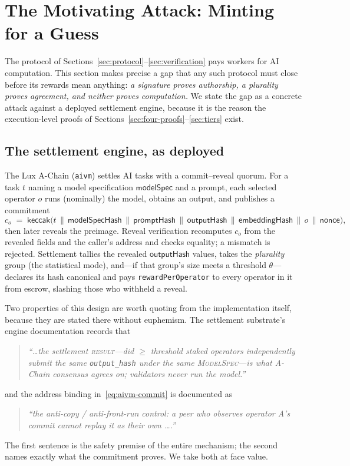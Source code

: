 \section{The Motivating Attack: Minting for a Guess}
\label{sec:guess-to-mint}

The protocol of Sections~\ref{sec:protocol}--\ref{sec:verification} pays workers
for AI computation. This section makes precise a gap that any such protocol must
close before its rewards mean anything: \emph{a signature proves authorship, a
plurality proves agreement, and neither proves computation.} We state the gap as
a concrete attack against a deployed settlement engine, because it is the reason
the execution-level proofs of Sections~\ref{sec:four-proofs}--\ref{sec:tiers}
exist.

\subsection{The settlement engine, as deployed}

The Lux A-Chain (\texttt{aivm}) settles AI tasks with a commit--reveal quorum.
For a task $t$ naming a model specification $\mathsf{modelSpec}$ and a prompt,
each selected operator $o$ runs (nominally) the model, obtains an output, and
publishes a commitment
\begin{equation}
\label{eq:aivm-commit}
c_o \;=\; \mathsf{keccak}\bigl(t \,\|\, \mathsf{modelSpecHash} \,\|\,
   \mathsf{promptHash} \,\|\, \mathsf{outputHash} \,\|\,
   \mathsf{embeddingHash} \,\|\, o \,\|\, \mathsf{nonce}\bigr),
\end{equation}
then later reveals the preimage. Reveal verification recomputes $c_o$ from the
revealed fields and the caller's address and checks equality; a mismatch is
rejected. Settlement tallies the revealed $\mathsf{outputHash}$ values, takes the
\emph{plurality} group (the statistical mode), and---if that group's size meets a
threshold $\theta$---declares its hash canonical and pays \texttt{rewardPerOperator}
to every operator in it from escrow, slashing those who withheld a reveal.

Two properties of this design are worth quoting from the implementation itself,
because they are stated there without euphemism. The settlement substrate's
engine documentation records that
\begin{quote}\itshape
``\ldots the settlement \textsc{result}---did $\ge$ threshold staked operators
independently submit the same \texttt{output\_hash} under the same
\textsc{ModelSpec}---is what A-Chain consensus agrees on; validators never run the
model.''
\end{quote}
and the address binding in~\eqref{eq:aivm-commit} is documented as
\begin{quote}\itshape
``the anti-copy / anti-front-run control: a peer who observes operator A's commit
cannot replay it as their own \ldots.''
\end{quote}
The first sentence is the safety premise of the entire mechanism; the second names
exactly what the commitment proves. We take both at face value.

